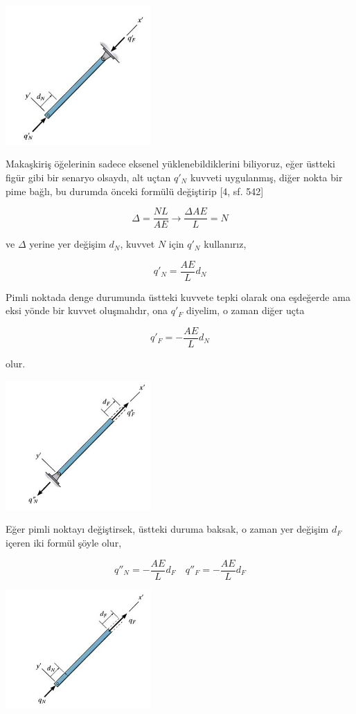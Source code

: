 \documentclass[12pt,fleqn]{article}\usepackage{../../common}
\begin{document}
\includegraphics[width=15em]{phy_020_strs_05_06.jpg}

Makaşkiriş öğelerinin sadece eksenel yüklenebildiklerini biliyoruz, eğer üstteki
figür gibi bir senaryo olsaydı, alt uçtan $q'_N$ kuvveti uygulanmış, diğer nokta
bir pime bağlı, bu durumda önceki formülü değiştirip [4, sf. 542]

$$
\Delta = \frac{NL}{AE} \to \frac{\Delta AE}{L} = N
$$

ve $\Delta$ yerine yer değişim $d_N$, kuvvet $N$ için $q'_N$ kullanırız,

$$
q'_N = \frac{AE}{L} d_N
$$

Pimli noktada denge durumunda üstteki kuvvete tepki olarak ona eşdeğerde ama
eksi yönde bir kuvvet oluşmalıdır, ona $q'_F$ diyelim, o zaman diğer uçta

$$
q'_F = -\frac{AE}{L} d_N
$$

olur.

\includegraphics[width=15em]{phy_020_strs_05_07.jpg}

Eğer pimli noktayı değiştirsek, üstteki duruma baksak, o zaman yer değişim
$d_F$ içeren iki formül şöyle olur,

$$
q''_N = - \frac{AE}{L} d_F \quad
q''_F = - \frac{AE}{L} d_F 
$$

\includegraphics[width=15em]{phy_020_strs_05_08.jpg}
\end{document}
